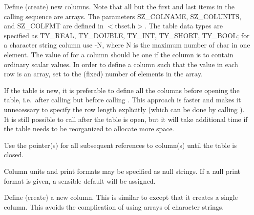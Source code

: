 Define (create) new columns.
Note that all but the first and last items in the calling sequence are arrays.
The parameters SZ\_COLNAME, SZ\_COLUNITS, and SZ\_COLFMT
are defined in $<$tbset.h$>$.
The table data types are specified as
TY\_REAL, TY\_DOUBLE, TY\_INT, TY\_SHORT, TY\_BOOL;
for a character string column use -N,
where N is the maximum number of char in one element.
The value of  for a column should be one
if the column is to contain ordinary scalar values.
In order to define a column such that the value in each row is an array,
set  to the (fixed) number of elements in the array.

If the table is new,
it is preferable to define all the columns before opening the table,
i.e.~after calling  but before calling .
This approach is faster and makes it unnecessary to specify
the row length explicitly (which can be done by calling ).
It is still possible to call  after the table is open,
but it will take additional time
if the table needs to be reorganized to allocate more space.

Use the  pointer(s) for all subsequent references
to column(s) until the table is closed.

\callseqtable

Column units and print formats may be specified as null strings.
If a null print format is given, a sensible default will be assigned.

\begin{callseq}
\end{callseq}

Define (create) a new column.
This is similar to  except that it creates a single column.
This avoids the complication of using arrays of character strings.

\callseqtable

\begin{callseq}
\end{callseq}

